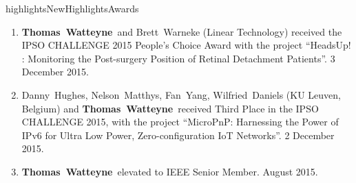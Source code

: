 \documentclass{ra2016}
\newcommand{\thomas}  {\textbf{Thomas~Watteyne}}
\begin{document}


\begin{module}{highlights}{NewHighlights}{Awards}



\begin{enumerate}
    \item \thomas~and Brett~Warneke (Linear Technology) received the IPSO CHALLENGE 2015 People's Choice Award  with the project ``HeadsUp! : Monitoring the Post-surgery Position of Retinal Detachment Patients''. 3 December 2015.
    \item Danny~Hughes, Nelson~Matthys, Fan~Yang, Wilfried~Daniels (KU Leuven, Belgium) and \thomas~received Third Place in the IPSO CHALLENGE 2015, with the project ``MicroPnP: Harnessing the Power of IPv6 for Ultra Low Power, Zero-configuration IoT Networks''. 2 December 2015.
    \item \thomas~elevated to IEEE Senior Member. August 2015.
\end{enumerate}

\end{module}

\end{document}
